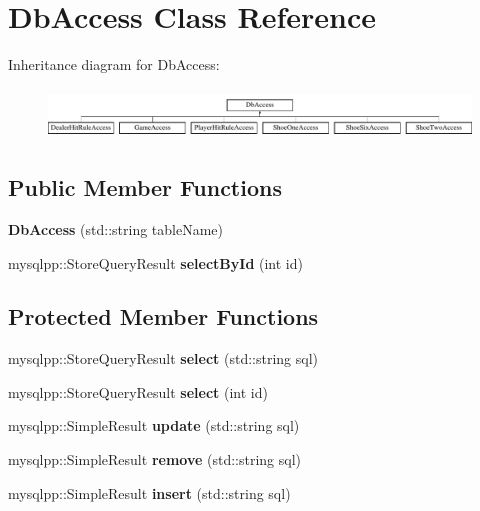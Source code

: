 \hypertarget{classDbAccess}{
\section{\-Db\-Access \-Class \-Reference}
\label{classDbAccess}
}
\-Inheritance diagram for \-Db\-Access\-:\begin{figure}[H]
\begin{center}
\leavevmode
\includegraphics[height=1.333333cm]{classDbAccess}
\end{center}
\end{figure}
\subsection*{\-Public \-Member \-Functions}
\begin{DoxyCompactItemize}
\item 
\hypertarget{classDbAccess_a97dec76caf946793ab4aaac95fe4dbfb}{
{\bfseries \-Db\-Access} (std\-::string table\-Name)}
\label{classDbAccess_a97dec76caf946793ab4aaac95fe4dbfb}

\item 
\hypertarget{classDbAccess_aebb66b3c7c7a6416fdf6d23ca044dafe}{
mysqlpp\-::\-Store\-Query\-Result {\bfseries select\-By\-Id} (int id)}
\label{classDbAccess_aebb66b3c7c7a6416fdf6d23ca044dafe}

\end{DoxyCompactItemize}
\subsection*{\-Protected \-Member \-Functions}
\begin{DoxyCompactItemize}
\item 
\hypertarget{classDbAccess_a2688e89342a14b016091f0abcbbfa895}{
mysqlpp\-::\-Store\-Query\-Result {\bfseries select} (std\-::string sql)}
\label{classDbAccess_a2688e89342a14b016091f0abcbbfa895}

\item 
\hypertarget{classDbAccess_ac3b957af4b56e4d9b2f191ba0a04a3ce}{
mysqlpp\-::\-Store\-Query\-Result {\bfseries select} (int id)}
\label{classDbAccess_ac3b957af4b56e4d9b2f191ba0a04a3ce}

\item 
\hypertarget{classDbAccess_afcc558d24b1503febb0fad72e50ab05e}{
mysqlpp\-::\-Simple\-Result {\bfseries update} (std\-::string sql)}
\label{classDbAccess_afcc558d24b1503febb0fad72e50ab05e}

\item 
\hypertarget{classDbAccess_ab39c9c3013a8fa694ed912280abfc48b}{
mysqlpp\-::\-Simple\-Result {\bfseries remove} (std\-::string sql)}
\label{classDbAccess_ab39c9c3013a8fa694ed912280abfc48b}

\item 
\hypertarget{classDbAccess_afa543877ce4ba63c6c80e27c2edd388f}{
mysqlpp\-::\-Simple\-Result {\bfseries insert} (std\-::string sql)}
\label{classDbAccess_afa543877ce4ba63c6c80e27c2edd388f}

\end{DoxyCompactItemize}
